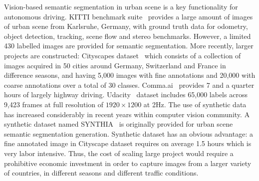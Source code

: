 \documentclass[10pt,twocolumn,letterpaper]{article}
\begin{document}
Vision-based semantic segmentation in urban scene is a key functionality for autonomous driving.
KITTI benchmark suite~\cite{Geiger2013IJRR} provides a large amount of images of urban scene from Karlsruhe, Germany, with ground truth data for odometry, object detection, tracking, scene flow and stereo benchmarks. However, a limited 430 labelled images are provided for semantic segmentation.
More recently, larger projects are constructed:
Cityscapes dataset~\cite{Cordts2016Cityscapes} which consists of a collection of images acquired in 50 cities around Germany, Switzerland and France in difference seasons, and having 5,000 images with fine annotations and 20,000 with coarse annotations over a total of 30 classes. Comma.ai~\cite{santana2016learning} provides 7 and a quarter hours of largely highway driving. Udacity~\cite{udacity} dataset includes 65,000 labels across 9,423 frames at full resolution of $1920\times1200$ at 2Hz.
The use of synthetic data has increased considerably in recent years within computer vision community. A synthetic dataset named SYNTHIA~\cite{mueller2016benchmark} is originally provided for urban scene semantic segmentation generation.
Synthetic dataset has an obvious advantage: a fine annotated image in Cityscape dataset requires on average 1.5 hours which is very labor intensive. Thus, the cost of scaling large project would require a prohibitive economic investment in order to capture images from a larger variety of countries, in different seasons and different traffic conditions.
\end{document}
